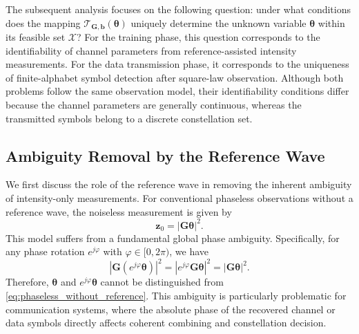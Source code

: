\documentclass[journal]{IEEEtran}
\begin{document}
The subsequent analysis focuses on the following question: under what conditions does the mapping $\mathcal{T}_{\mathbf{G},\mathbf{b}}(\boldsymbol{\theta})$ uniquely determine the unknown variable $\boldsymbol{\theta}$ within its feasible set $\mathcal{X}$? 
For the training phase, this question corresponds to the identifiability of channel parameters from reference-assisted intensity measurements. 
For the data transmission phase, it corresponds to the uniqueness of finite-alphabet symbol detection after square-law observation. 
Although both problems follow the same observation model, their identifiability conditions differ because the channel parameters are generally continuous, whereas the transmitted symbols belong to a discrete constellation set.

\subsection{Ambiguity Removal by the Reference Wave}

We first discuss the role of the reference wave in removing the inherent ambiguity of intensity-only measurements. 
For conventional phaseless observations without a reference wave, the noiseless measurement is given by
\begin{equation}
\mathbf{z}_0
=
|\mathbf{G}\boldsymbol{\theta}|^2.
\label{eq:phaseless_without_reference}
\end{equation}
This model suffers from a fundamental global phase ambiguity. 
Specifically, for any phase rotation $e^{j\varphi}$ with $\varphi\in[0,2\pi)$, we have
\begin{equation}
|\mathbf{G}(e^{j\varphi}\boldsymbol{\theta})|^2
=
|e^{j\varphi}\mathbf{G}\boldsymbol{\theta}|^2
=
|\mathbf{G}\boldsymbol{\theta}|^2.
\label{eq:global_phase_ambiguity}
\end{equation}
Therefore, $\boldsymbol{\theta}$ and $e^{j\varphi}\boldsymbol{\theta}$ cannot be distinguished from \eqref{eq:phaseless_without_reference}. 
This ambiguity is particularly problematic for communication systems, where the absolute phase of the recovered channel or data symbols directly affects coherent combining and constellation decision.
\end{document}
